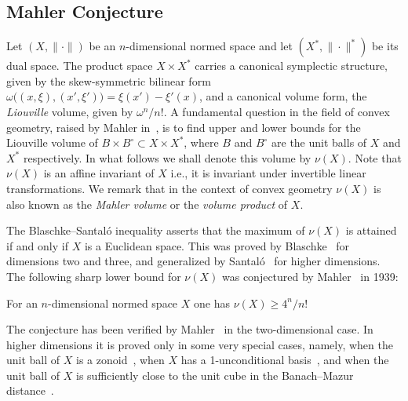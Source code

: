 \documentclass[11pt]{article}
\begin{document}
\subsection{Mahler Conjecture}
Let $(X,\| \cdot \|)$ be an $n$-dimensional normed space and let
$(X^*,\| \cdot \|^*)$  be its dual space. The product space $X
\times X^*$ carries a canonical symplectic structure, given by the
skew-symmetric bilinear form $\omega \bigl ( (x,\xi),(x',\xi') \bigr
) = \xi(x')-\xi'(x)$, and a canonical volume form, the {\it
Liouville} volume, given by $ \omega^n/n!$. A fundamental question
in the field of convex geometry, raised by Mahler in~\cite{Ma}, is to find  upper and lower bounds for the
Liouville volume of $B \times B^{\circ} \subset X \times X^*$, where
$B$ and $B^{\circ}$ are the unit balls of $X$ and $X^*$
respectively. In what follows we shall denote this volume by
$\nu(X)$. 
Note that $\nu(X)$ is an affine invariant of $X$ i.e., it
is invariant under invertible linear transformations. We remark that
in the context of convex geometry $\nu(X)$ is also known as the
{\it Mahler volume} or the {\it volume product} of $X$.

The Blaschke--Santal\'o inequality asserts that the maximum of
$\nu(X)$ is attained if and only if $X$ is a Euclidean space. This
was proved by Blaschke~\cite{Bl} for dimensions two and three, and
generalized by Santal\'o~\cite{Sa} for higher dimensions. 
The following sharp lower bound for $\nu(X)$ was
conjectured by Mahler~\cite{Ma} in 1939:


 \label{Mahler-Conj} For an
$n$-dimensional normed space $X$ one has $\nu(X) \geq 4^n/n!$ 

The conjecture has been verified by Mahler~\cite{Ma} in the
two-dimensional case. In higher dimensions it is proved only in
some very special cases, namely, when the unit ball of $X$ is a
zonoid~\cite{GMR,R1}, when $X$ has a 1-unconditional
basis~\cite{ME1,SR,R2}, and when the unit ball of
$X$ is sufficiently close to the unit cube in the Banach--Mazur
distance~\cite{NPRZ}. %
\end{document}
